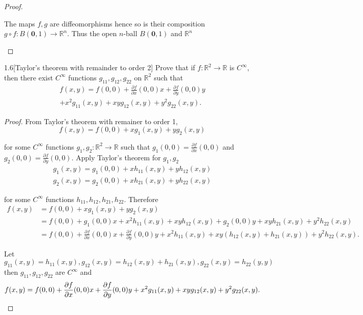 \begin{proof}
\begin{enumerate}[label={(\alph*)},leftmargin=*]
		      The maps \( f, g \) are diffeomorphisms hence so is their composition \( g\circ f: B(\mathbf{0}, 1) \to \mathbb{R}^{n} \). Thus the open \(n\)-ball \( B(\mathbf{0}, 1) \) and \( \mathbb{R}^{n} \)
	\end{enumerate}
\end{proof}

\begin{problem}{1.6}[Taylor's theorem with remainder to order 2]
Prove that if \( f : \mathbb{R}^{2} \to \mathbb{R} \) is \( C^{\infty} \), then there exist \( C^{\infty} \) functions \( g_{11}, g_{12}, g_{22} \) on \( \mathbb{R}^{2} \) such that
\begin{multline*}
	f(x,y) = f(0,0) + \frac{\partial f}{\partial x} (0,0)x + \frac{\partial f}{\partial y} (0,0)y \\
	+ x^{2} g_{11}(x,y) + xy g_{12}(x,y) + y^{2} g_{22}(x,y).
\end{multline*}
\end{problem}

\begin{proof}
	From Taylor's theorem with remainer to order 1,
	\[
		f(x, y) = f(0, 0) + xg_{1}(x, y) + yg_{2}(x, y)
	\]

	for some \( C^{\infty} \) functions \( g_{1}, g_{2}: \mathbb{R}^{2} \to \mathbb{R} \) such that \( g_{1}(0, 0) = \frac{\partial f}{\partial x}(0, 0) \) and \( g_{2}(0, 0) = \frac{\partial f}{\partial y}(0, 0) \). Apply Taylor's theorem for \( g_{1}, g_{2} \)
	\[
		\begin{split}
			g_{1}(x, y) = g_{1}(0, 0) + xh_{11}(x, y) + yh_{12}(x, y) \\
			g_{2}(x, y) = g_{2}(0, 0) + xh_{21}(x, y) + yh_{22}(x, y)
		\end{split}
	\]

	for some \( C^{\infty} \) functions \( h_{11}, h_{12}, h_{21}, h_{22} \). Therefore
	\begin{align*}
		f(x, y) & = f(0, 0) + xg_{1}(x, y) + yg_{2}(x, y)                                                                                                                            \\
		        & = f(0, 0) + g_{1}(0, 0)x + x^{2}h_{11}(x, y) + xyh_{12}(x, y) + g_{2}(0, 0)y + xyh_{21}(x, y) + y^{2}h_{22}(x, y)                                                  \\
		        & = f(0, 0) + \frac{\partial f}{\partial x}(0, 0)x + \frac{\partial f}{\partial y}(0, 0)y + x^{2}h_{11}(x, y) + xy(h_{12}(x, y) + h_{21}(x, y)) + y^{2}h_{22}(x, y).
	\end{align*}

	Let \( g_{11}(x, y) = h_{11}(x, y), g_{12}(x, y) = h_{12}(x, y) + h_{21}(x, y), g_{22}(x, y) = h_{22}(y, y) \) then \( g_{11}, g_{12}, g_{22} \) are \( C^{\infty} \) and
	\[
		f(x, y) = f(0, 0) + \frac{\partial f}{\partial x}(0, 0)x + \frac{\partial f}{\partial y}(0, 0)y + x^{2}g_{11}(x, y) + xyg_{12}(x, y) + y^{2}g_{22}(x, y). \qedhere
	\]
\end{proof}

